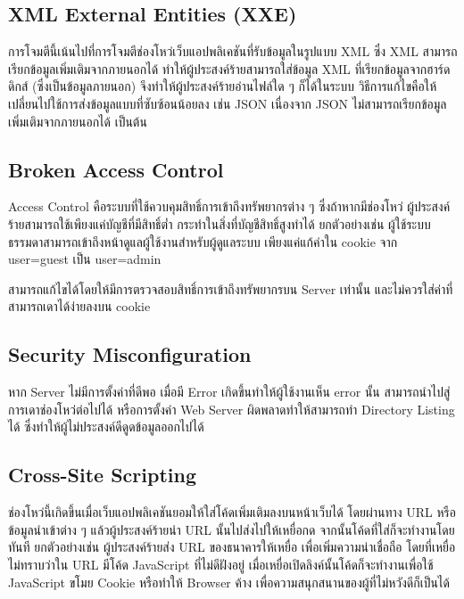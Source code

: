 \subsection{XML External Entities (XXE)}
การโจมตีนี้เน้นไปที่การโจมตีช่องโหว่เว็บแอปพลิเคชันที่รับข้อมูลในรูปแบบ XML \cite{???} ซึ่ง XML สามารถเรียกข้อมูลเพิ่มเติมจากภายนอกได้ ทำให้ผู้ประสงค์ร้ายสามารถใส่ข้อมูล XML ที่เรียกข้อมูลจากฮาร์ดดิกส์ (ซึ่งเป็นข้อมูลภายนอก) จึงทำให้ผู้ประสงค์ร้ายอ่านไฟล์ใด ๆ ก็ได้ในระบบ \cite{???}
วิธีการแก้ไขคือให้เปลี่ยนไปใช้การส่งข้อมูลแบบที่ซับซ้อนน้อยลง เช่น JSON เนื่องจาก JSON ไม่สามารถเรียกข้อมูลเพิ่มเติมจากภายนอกได้ เป็นต้น

\subsection{Broken Access Control}

Access Control คือระบบที่ใช้ควบคุมสิทธิ์การเข้าถึงทรัพยากรต่าง ๆ ซึ่งถ้าหากมีช่องโหว่ ผู้ประสงค์ร้ายสามารถใช้เพียงแค่บัญชีที่มีสิทธิ์ต่ำ กระทำในสิ่งที่บัญชีสิทธิ์สูงทำได้ ยกตัวอย่างเช่น ผู้ใช้ระบบธรรมดาสามารถเข้าถึงหน้าดูแลผู้ใช้งานสำหรับผู้ดูแลระบบ เพียงแค่แก้ค่าใน cookie จาก user=guest เป็น user=admin

สามารถแก้ไขได้โดยให้มีการตรวจสอบสิทธิ์การเข้าถึงทรัพยากรบน Server เท่านั้น และไม่ควรใส่ค่าที่สามารถเดาได้ง่ายลงบน cookie

\subsection{Security Misconfiguration}
หาก Server ไม่มีการตั้งค่าที่ดีพอ เมื่อมี Error เกิดขึ้นทำให้ผู้ใช้งานเห็น error นั้น สามารถนำไปสู่การเดาช่องโหว่ต่อไปได้ หรือการตั้งค่า Web Server ผิดพลาดทำให้สามารถทำ Directory Listing ได้ \cite{???} ซึ่งทำให้ผู้ไม่ประสงค์ดีดูดข้อมูลออกไปได้

\subsection{Cross-Site Scripting}
ช่องโหว่นี้เกิดขึ้นเมื่อเว็บแอปพลิเคชันยอมให้ใส่โค้ดเพิ่มเติมลงบนหน้าเว็บได้ โดยผ่านทาง URL หรือข้อมูลนำเข้าต่าง ๆ แล้วผู้ประสงค์ร้ายนำ URL นั้นไปส่งไปให้เหยื่อกด จากนั้นโค้ดที่ใส่ก็จะทำงานโดยทันที ยกตัวอย่างเช่น ผู้ประสงค์ร้ายส่ง URL ของธนาคารให้เหยื่อ เพื่อเพิ่มความน่าเชื่อถือ โดยที่เหยื่อไม่ทราบว่าใน URL มีโค้ด JavaScript ที่ไม่ดีฝังอยู่ เมื่อเหยื่อเปิดลิงค์นั้นโค้ดก็จะทำงานเพื่อใช้ JavaScript ขโมย Cookie หรือทำให้ Browser ค้าง เพื่อความสนุกสนานของผู้ที่ไม่หวังดีก็เป็นได้ \cite{???}

